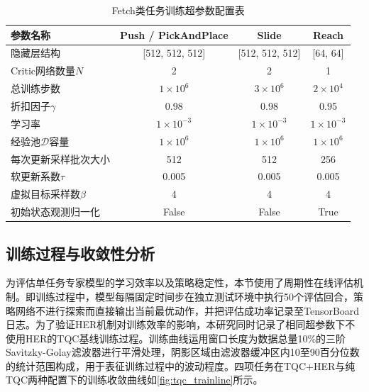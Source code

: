 \begin{table}[!htb]
  \caption{Fetch类任务训练超参数配置表}\label{tab:fetch-hyperparams}
  \centering
  \small
  \begin{tabular}{@{} l ccc @{}} \toprule
    \textbf{参数名称} & \textbf{Push / PickAndPlace} & \textbf{Slide} & \textbf{Reach} \\ \midrule
    隐藏层结构 & [512, 512, 512] & [512, 512, 512] & [64, 64] \\
    Critic网络数量$N$ & 2 & 2 & 1 \\
    总训练步数 & $1 \times 10^6$ & $3 \times 10^6$ & $2 \times 10^4$ \\
    折扣因子$\gamma$ & 0.98 & 0.98 & 0.95 \\
    学习率 & $1 \times 10^{-3}$ & $1 \times 10^{-3}$ & $1 \times 10^{-3}$ \\
    经验池$\mathcal{D}$容量 & $1 \times 10^6$ & $1 \times 10^6$ & $1 \times 10^6$ \\
    每次更新采样批次大小 & 512 & 512 & 256 \\
    软更新系数$\tau$ & 0.005 & 0.005 & 0.005 \\
    虚拟目标采样数$\beta$ & 4 & 4 & 4 \\
    初始状态观测归一化 & False & False & True \\ \bottomrule
  \end{tabular}
\end{table}

\subsection{训练过程与收敛性分析}\label{sec:convergence-analysis}
为评估单任务专家模型的学习效率以及策略稳定性，本节使用了周期性在线评估机制。即训练过程中，模型每隔固定时间步在独立测试环境中执行50个评估回合，策略网络不进行探索而直接输出当前最优动作，并把评估成功率记录至TensorBoard日志。为了验证HER机制对训练效率的影响，本研究同时记录了相同超参数下不使用HER的TQC基线训练过程。训练曲线运用窗口长度为数据总量10\%的三阶Savitzky-Golay滤波器进行平滑处理，阴影区域由滤波器缓冲区内10至90百分位数的统计范围构成，用于表征训练过程中的波动程度。四项任务在TQC+HER与纯TQC两种配置下的训练收敛曲线如\cref{fig:tqc_trainline}所示。

